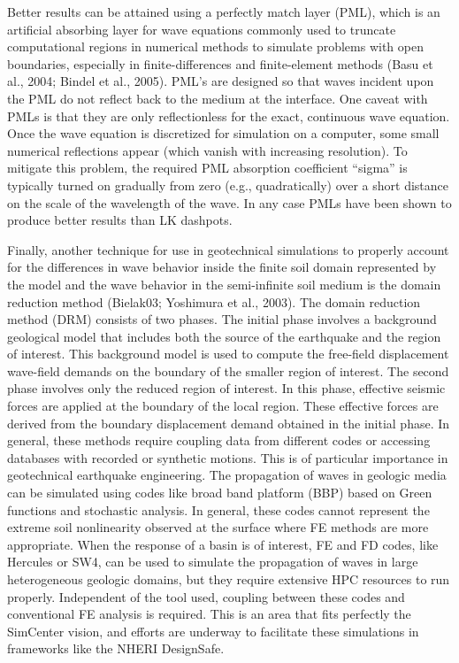Better results can be attained using a perfectly match layer (PML), which is an artificial absorbing layer for wave equations commonly used to truncate computational regions in numerical methods to simulate problems with open boundaries, especially in finite-differences and finite-element methods (Basu et al., 2004; Bindel et al., 2005). PML’s are designed so that waves incident upon the PML do not reflect back to the medium at the interface. One caveat with PMLs is that they are only reflectionless for the exact, continuous wave equation. Once the wave equation is discretized for simulation on a computer, some small numerical reflections appear (which vanish with increasing resolution). To mitigate this problem, the required PML absorption coefficient “sigma” is typically turned on gradually from zero (e.g., quadratically) over a short distance on the scale of the wavelength of the wave. In any case PMLs have been shown to produce better results than LK dashpots.

Finally, another technique for use in geotechnical simulations to properly account for the diﬀerences in wave behavior inside the ﬁnite soil domain represented by the model and the wave behavior in the semi-inﬁnite soil medium is the domain reduction method (Bielak03; Yoshimura et al., 2003). The domain reduction method (DRM) consists of two phases. The initial phase involves a background geological model that includes both the source of the earthquake and the region of interest. This background model is used to compute the free-ﬁeld displacement wave-ﬁeld demands on the boundary of the smaller region of interest. The second phase involves only the reduced region of interest. In this phase, eﬀective seismic forces are applied at the boundary of the local region. These eﬀective forces are derived from the boundary displacement demand obtained in the initial phase. In general, these methods require coupling data from different codes or accessing databases with recorded or synthetic motions. This is of particular importance in geotechnical earthquake engineering. The propagation of waves in geologic media can be simulated using codes like broad band platform (BBP) based on Green functions and stochastic analysis. In general, these codes cannot represent the extreme soil nonlinearity observed at the surface where FE methods are more appropriate. When the response of a basin is of interest, FE and FD codes, like Hercules or SW4, can be used to simulate the propagation of waves in large heterogeneous geologic domains, but they require extensive HPC resources to run properly. Independent of the tool used, coupling between these codes and conventional FE analysis is required. This is an area that fits perfectly the SimCenter vision, and efforts are underway to facilitate these simulations in frameworks like the NHERI DesignSafe.

